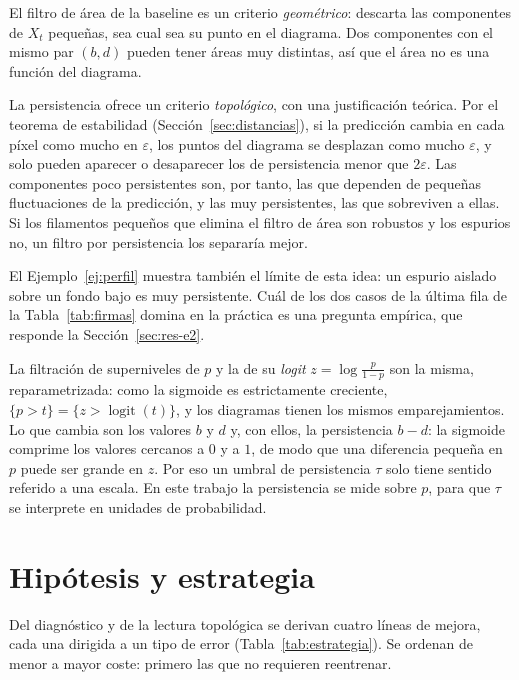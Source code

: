 El filtro de área de la baseline es un criterio \emph{geométrico}:
descarta las componentes de $X_t$ pequeñas, sea cual sea su punto en el
diagrama. Dos componentes con el mismo par $(b,d)$ pueden tener áreas muy
distintas, así que el área no es una función del diagrama.

La persistencia ofrece un criterio \emph{topológico}, con una
justificación teórica. Por el teorema de estabilidad
(Sección~\ref{sec:distancias}), si la predicción cambia en cada píxel
como mucho en $\varepsilon$, los puntos del diagrama se desplazan como
mucho $\varepsilon$, y solo pueden aparecer o desaparecer los de
persistencia menor que $2\varepsilon$. Las componentes poco persistentes
son, por tanto, las que dependen de pequeñas fluctuaciones de la
predicción, y las muy persistentes, las que sobreviven a ellas. Si los
filamentos pequeños que elimina el filtro de área son robustos y los
espurios no, un filtro por persistencia los separaría mejor.

El Ejemplo~\ref{ej:perfil} muestra también el límite de esta idea: un
espurio aislado sobre un fondo bajo es muy persistente. Cuál de los dos
casos de la última fila de la Tabla~\ref{tab:firmas} domina en la
práctica es una pregunta empírica, que responde la
Sección~\ref{sec:res-e2}.

\begin{observacion}
La filtración de superniveles de $p$ y la de su \emph{logit}
$z=\log\frac{p}{1-p}$ son la misma, reparametrizada: como la sigmoide es
estrictamente creciente, $\{p>t\}=\{z>\operatorname{logit}(t)\}$, y los
diagramas tienen los mismos emparejamientos. Lo que cambia son los
valores $b$ y $d$ y, con ellos, la persistencia $b-d$: la sigmoide
comprime los valores cercanos a $0$ y a $1$, de modo que una diferencia
pequeña en $p$ puede ser grande en $z$. Por eso un umbral de
persistencia $\tau$ solo tiene sentido referido a una escala. En este
trabajo la persistencia se mide sobre $p$, para que $\tau$ se interprete
en unidades de probabilidad.
\end{observacion}

\section{Hipótesis y estrategia}
\label{sec:estrategia}

Del diagnóstico y de la lectura topológica se derivan cuatro líneas de
mejora, cada una dirigida a un tipo de error
(Tabla~\ref{tab:estrategia}). Se ordenan de menor a mayor coste: primero
las que no requieren reentrenar.

